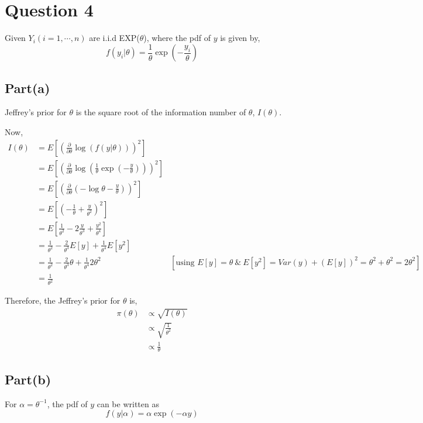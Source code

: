 \documentclass[a4paper]{article}
\begin{document}
\newpage

\section*{Question 4}
Given \(Y_i (i = 1,\cdots, n)\) are i.i.d EXP(\(\theta\)), where the pdf of \(y\) is given by,
\[f(y_i|\theta) = \frac{1}{\theta} \exp(-\frac{y_i}{\theta})\]

\subsection*{Part(a)}
Jeffrey's prior for \(\theta\) is the square root of the information number of \(\theta\), \(I(\theta)\).

Now,
\begin{align*}
    I(\theta) &= E \left[\left(\frac{\partial}{\partial \theta } \log(f(y|\theta))\right)^2\right]\\
    &= E \left[\left(\frac{\partial}{\partial \theta } \log\left(\frac{1}{\theta}\exp\left(-\frac{y}{\theta}\right)\right)\right)^2\right] \\
    &=E \left[\left(\frac{\partial}{\partial \theta }\left(-\log\theta- \frac{y}{\theta}\right)\right)^2\right]\\
    &=E \left[\left(-\frac{1}{\theta}+ \frac{y}{\theta^2}\right)^2\right]\\
    &=E \left[\frac{1}{\theta^2} - 2\frac{y}{\theta^3} + \frac{y^2}{\theta^4}\right]\\
    &= \frac{1}{\theta^2} - \frac{2}{\theta^3} E[y] + \frac{1}{\theta^4} E[y^2]\\
    &= \frac{1}{\theta^2} - \frac{2}{\theta^3} \theta + \frac{1}{\theta^4} 2\theta^2 & \left[\text{using } E[y]=\theta \ \&\ E[y^2] = Var(y) + (E[y])^2 =\theta^2 + \theta^2 =2\theta^2\right]\\
    &= \frac{1}{\theta^2}
\end{align*}

Therefore, the Jeffrey's prior for \(\theta\) is,
\begin{align*}
    \pi(\theta) &\propto \sqrt{I(\theta)}\\
    &\propto \sqrt{\frac{1}{\theta^2}}\\
    &\propto \frac{1}{\theta}
\end{align*}

\subsection*{Part(b)}
For \(\alpha = \theta^{-1}\), the pdf of \(y\) can be written as 
\[
    f(y|\alpha) = \alpha \exp(-\alpha y)
\]
\end{document}
